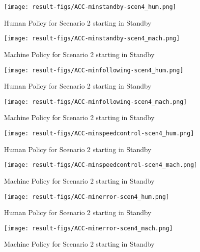 \begin{figure}[h]
    \texttt{[image: result-figs/ACC-minstandby-scen4\_hum.png]}
    \caption{Human Policy for Scenario 2 starting in Standby}
    \label{fig:standby-s4-hum}
\end{figure}

\begin{figure}[h]
    \texttt{[image: result-figs/ACC-minstandby-scen4\_mach.png]}
    \caption{Machine Policy for Scenario 2 starting in Standby}
    \label{fig:standby-s4-mach}
\end{figure}

\begin{figure}[h]
    \texttt{[image: result-figs/ACC-minfollowing-scen4\_hum.png]}
    \caption{Human Policy for Scenario 2 starting in Standby}
    \label{fig:following-s4-hum}
\end{figure}

\begin{figure}[h]
    \texttt{[image: result-figs/ACC-minfollowing-scen4\_mach.png]}
    \caption{Machine Policy for Scenario 2 starting in Standby}
    \label{fig:following-s4-mach}
\end{figure}

\begin{figure}[h]
    \texttt{[image: result-figs/ACC-minspeedcontrol-scen4\_hum.png]}
    \caption{Human Policy for Scenario 2 starting in Standby}
    \label{fig:speedcontrol-s4-hum}
\end{figure}

\begin{figure}[h]
    \texttt{[image: result-figs/ACC-minspeedcontrol-scen4\_mach.png]}
    \caption{Machine Policy for Scenario 2 starting in Standby}
    \label{fig:speedcontrol-s4-mach}
\end{figure}

\begin{figure}[h]
    \texttt{[image: result-figs/ACC-minerror-scen4\_hum.png]}
    \caption{Human Policy for Scenario 2 starting in Standby}
    \label{fig:error-s4-hum}
\end{figure}

\begin{figure}[h]
    \texttt{[image: result-figs/ACC-minerror-scen4\_mach.png]}
    \caption{Machine Policy for Scenario 2 starting in Standby}
    \label{fig:error-s4-mach}
\end{figure}

